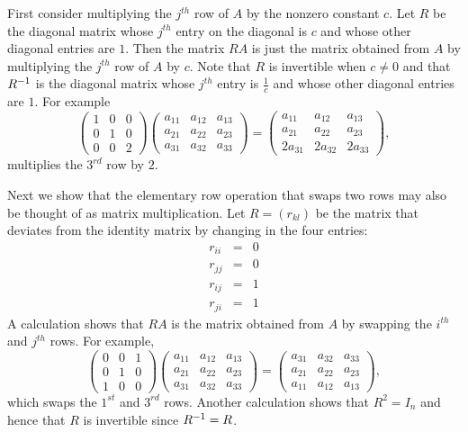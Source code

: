 \documentclass{ximera}
\begin{document}
\proof  First consider multiplying the $j^{th}$ row of $A$ by the
nonzero constant $c$.  Let $R$ be the diagonal matrix whose
$j^{th}$ entry on the diagonal is $c$ and whose other diagonal 
entries are $1$.  Then the matrix $RA$ is just the matrix obtained from 
$A$ by multiplying the $j^{th}$ row of $A$ by $c$.  Note that $R$ is
invertible when $c\neq 0$ and that $R^{-1}$ is the diagonal
matrix whose $j^{th}$ entry is $\frac{1}{c}$ and whose other
diagonal entries are $1$.  For example
\[
\left(\begin{array}{ccc} 1 & 0 & 0\\ 0 & 1 & 0 \\ 0 & 0 & 2\end{array}\right)
\left(\begin{array}{ccc} a_{11} & a_{12} & a_{13}\\ a_{21} & a_{22} & a_{23}
 \\ a_{31} & a_{32} & a_{33} \end{array}\right) =
\left(\begin{array}{ccc} a_{11} & a_{12} & a_{13}\\ a_{21} & a_{22} & a_{23}
 \\ 2a_{31} & 2a_{32} & 2a_{33} \end{array}\right),
\]
multiplies the $3^{rd}$ row by $2$.

Next we show that the elementary row operation that swaps two
rows may also be thought of as matrix multiplication.  Let
$R=(r_{kl})$ be the matrix that deviates from the identity matrix
by changing in the four entries:
\begin{eqnarray*}
r_{ii} & = & 0 \\
r_{jj} & = & 0\\
r_{ij} & = & 1 \\
r_{ji} & = & 1
\end{eqnarray*}
A calculation shows that $RA$ is the matrix obtained from $A$ by
swapping the $i^{th}$ and $j^{th}$ rows.  For example,
\[
\left(\begin{array}{ccc} 0 & 0 & 1\\ 0 & 1 & 0 \\ 1 & 0 & 0\end{array}\right)
\left(\begin{array}{ccc} a_{11} & a_{12} & a_{13}\\ a_{21} & a_{22} & a_{23}
 \\ a_{31} & a_{32} & a_{33} \end{array}\right) =
\left(\begin{array}{ccc} a_{31} & a_{32} & a_{33}\\ a_{21} & a_{22} & a_{23}
 \\  a_{11} & a_{12} & a_{13} \end{array}\right),
\]
which swaps the $1^{st}$ and $3^{rd}$ rows.  Another calculation
shows that $R^2=I_n$ and hence that $R$ is invertible since
$R^{-1}=R$.  
\end{document}
